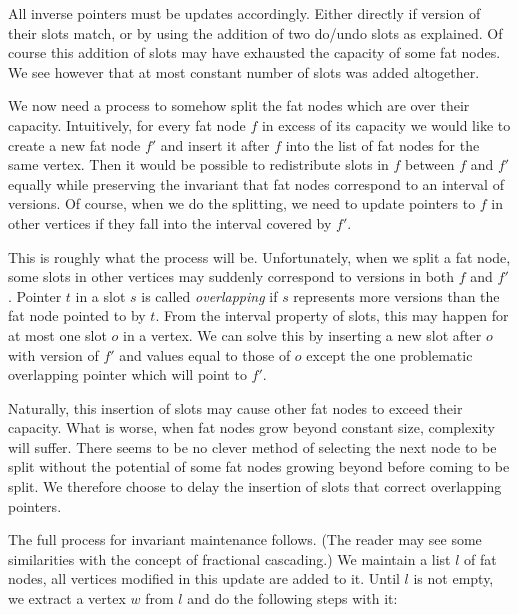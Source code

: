 All inverse pointers must be updates accordingly. Either directly if version of their slots match, or by using the addition of two do/undo slots as explained. Of course this addition of slots may have exhausted the capacity of some fat nodes. We see however that at most constant number of slots was added altogether. 

We now need a process to somehow split the fat nodes which are over their capacity. Intuitively, for every fat node $f$ in excess of its capacity we would like to create a new fat node $f'$ and insert it after $f$ into the list of fat nodes for the same vertex. Then it would be possible to redistribute slots in $f$ between $f$ and $f'$ equally while preserving the invariant that fat nodes correspond to an interval of versions. Of course, when we do the splitting, we need to update pointers to $f$ in other vertices if they fall into the interval covered by $f'$.

This is roughly what the process will be. Unfortunately, when we split a fat node, some slots in other vertices may suddenly correspond to versions in both $f$ and $f'$. Pointer $t$ in a slot $s$ is called \emph{overlapping} if $s$ represents more versions than the fat node pointed to by $t$.
From the interval property of slots, this may happen for at most one slot $o$ in a vertex. We can solve this by inserting a new slot after $o$ with version of $f'$ and values equal to those of $o$ except the one problematic overlapping pointer which will point to $f'$.

Naturally, this insertion of slots may cause other fat nodes to exceed their capacity. What is worse, when fat nodes grow beyond constant size, complexity will suffer. There seems to be no clever method of selecting the next node to be split without the potential of some fat nodes growing beyond  before coming to be split. We therefore choose to delay the insertion of slots that correct overlapping pointers.

The full process for invariant maintenance follows. (The reader may see some similarities with the concept of fractional cascading.) We maintain a list $l$ of fat nodes, all vertices modified in this update are added to it. Until $l$ is not empty, we extract a vertex $w$ from $l$ and do the following steps with it:


